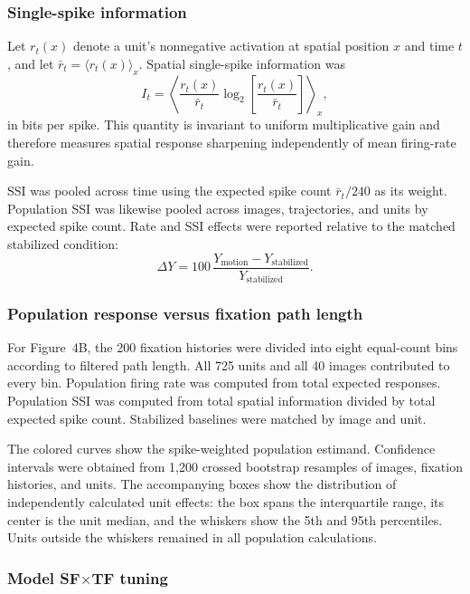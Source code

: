 \documentclass{lite}
\begin{document}
\subsubsection{Single-spike information}

Let $r_t(x)$ denote a unit's nonnegative activation at spatial position $x$ and time $t$, and let $\bar r_t=\langle r_t(x)\rangle_x$. Spatial single-spike information was
\begin{equation}
I_t =
\left\langle
\frac{r_t(x)}{\bar r_t}
\log_2\!\left[\frac{r_t(x)}{\bar r_t}\right]
\right\rangle_x ,
\end{equation}
in bits per spike. This quantity is invariant to uniform multiplicative gain and therefore measures spatial response sharpening independently of mean firing-rate gain.

SSI was pooled across time using the expected spike count $\bar r_t/240$ as its weight. Population SSI was likewise pooled across images, trajectories, and units by expected spike count. Rate and SSI effects were reported relative to the matched stabilized condition:
\begin{equation}
\Delta Y = 100\,
\frac{Y_{\mathrm{motion}}-Y_{\mathrm{stabilized}}}
     {Y_{\mathrm{stabilized}}}.
\end{equation}

\subsubsection{Population response versus fixation path length}

For Figure~4B, the 200 fixation histories were divided into eight equal-count bins according to filtered path length. All 725 units and all 40 images contributed to every bin. Population firing rate was computed from total expected responses. Population SSI was computed from total spatial information divided by total expected spike count. Stabilized baselines were matched by image and unit.

The colored curves show the spike-weighted population estimand. Confidence intervals were obtained from 1{,}200 crossed bootstrap resamples of images, fixation histories, and units. The accompanying boxes show the distribution of independently calculated unit effects: the box spans the interquartile range, its center is the unit median, and the whiskers show the 5th and 95th percentiles. Units outside the whiskers remained in all population calculations.

\subsubsection{Model SF$\times$TF tuning}
\end{document}
